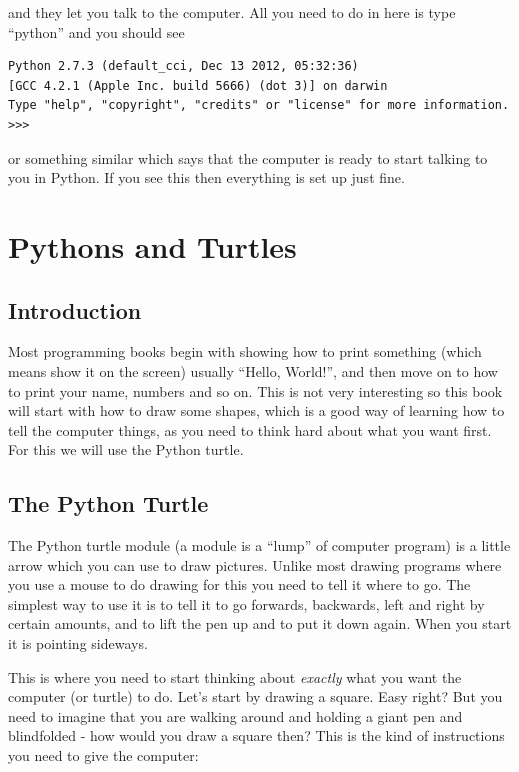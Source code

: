 \documentclass[a4paper, 11pt]{book}
\begin{document}
\noindent
and they let you talk to the computer. All you need to do in here is type ``python'' and you should see

{\small
\begin{verbatim}
Python 2.7.3 (default_cci, Dec 13 2012, 05:32:36) 
[GCC 4.2.1 (Apple Inc. build 5666) (dot 3)] on darwin
Type "help", "copyright", "credits" or "license" for more information.
>>> 
\end{verbatim}
}

\noindent 
or something similar which says that the computer is ready to start
talking to you in Python. If you see this then everything is set up
just fine. 

\chapter{Pythons and Turtles}

\section{Introduction}

Most programming books begin with showing how to print something
(which means show it on the screen) usually ``Hello, World!'', and
then move on to how to print your name, numbers and so on. This is not
very interesting so this book will start with how to draw some shapes,
which is a good way of learning how to tell the computer things, as
you need to think hard about what you want first. For this we will use
the Python turtle. 

\section{The Python Turtle}

The Python turtle module (a module is a ``lump'' of computer program)
is a little arrow which you can use to draw pictures. Unlike most
drawing programs where you use a mouse to do drawing for this you need
to tell it where to go. The simplest way to use it is to tell it to go
forwards, backwards, left and right by certain amounts, and to lift
the pen up and to put it down again. When you start it is pointing
sideways. 

This is where you need to start thinking about \emph{exactly} what you
want the computer (or turtle) to do. Let's start by drawing a
square. Easy right? But you need to imagine that you are walking
around and holding a giant pen and blindfolded - how would you draw a
square then? This is the kind of instructions you need to give the
computer: 
\end{document}
